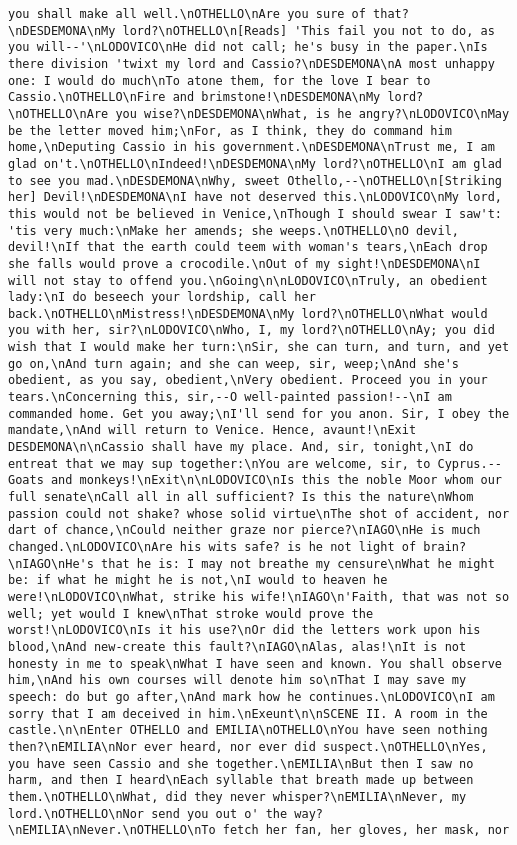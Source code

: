 \begin{verbatim}
you shall make all well.\nOTHELLO\nAre you sure of that?\nDESDEMONA\nMy lord?\nOTHELLO\n[Reads] 'This fail you not to do, as you will--'\nLODOVICO\nHe did not call; he's busy in the paper.\nIs there division 'twixt my lord and Cassio?\nDESDEMONA\nA most unhappy one: I would do much\nTo atone them, for the love I bear to Cassio.\nOTHELLO\nFire and brimstone!\nDESDEMONA\nMy lord?\nOTHELLO\nAre you wise?\nDESDEMONA\nWhat, is he angry?\nLODOVICO\nMay be the letter moved him;\nFor, as I think, they do command him home,\nDeputing Cassio in his government.\nDESDEMONA\nTrust me, I am glad on't.\nOTHELLO\nIndeed!\nDESDEMONA\nMy lord?\nOTHELLO\nI am glad to see you mad.\nDESDEMONA\nWhy, sweet Othello,--\nOTHELLO\n[Striking her] Devil!\nDESDEMONA\nI have not deserved this.\nLODOVICO\nMy lord, this would not be believed in Venice,\nThough I should swear I saw't: 'tis very much:\nMake her amends; she weeps.\nOTHELLO\nO devil, devil!\nIf that the earth could teem with woman's tears,\nEach drop she falls would prove a crocodile.\nOut of my sight!\nDESDEMONA\nI will not stay to offend you.\nGoing\n\nLODOVICO\nTruly, an obedient lady:\nI do beseech your lordship, call her back.\nOTHELLO\nMistress!\nDESDEMONA\nMy lord?\nOTHELLO\nWhat would you with her, sir?\nLODOVICO\nWho, I, my lord?\nOTHELLO\nAy; you did wish that I would make her turn:\nSir, she can turn, and turn, and yet go on,\nAnd turn again; and she can weep, sir, weep;\nAnd she's obedient, as you say, obedient,\nVery obedient. Proceed you in your tears.\nConcerning this, sir,--O well-painted passion!--\nI am commanded home. Get you away;\nI'll send for you anon. Sir, I obey the mandate,\nAnd will return to Venice. Hence, avaunt!\nExit DESDEMONA\n\nCassio shall have my place. And, sir, tonight,\nI do entreat that we may sup together:\nYou are welcome, sir, to Cyprus.--Goats and monkeys!\nExit\n\nLODOVICO\nIs this the noble Moor whom our full senate\nCall all in all sufficient? Is this the nature\nWhom passion could not shake? whose solid virtue\nThe shot of accident, nor dart of chance,\nCould neither graze nor pierce?\nIAGO\nHe is much changed.\nLODOVICO\nAre his wits safe? is he not light of brain?\nIAGO\nHe's that he is: I may not breathe my censure\nWhat he might be: if what he might he is not,\nI would to heaven he were!\nLODOVICO\nWhat, strike his wife!\nIAGO\n'Faith, that was not so well; yet would I knew\nThat stroke would prove the worst!\nLODOVICO\nIs it his use?\nOr did the letters work upon his blood,\nAnd new-create this fault?\nIAGO\nAlas, alas!\nIt is not honesty in me to speak\nWhat I have seen and known. You shall observe him,\nAnd his own courses will denote him so\nThat I may save my speech: do but go after,\nAnd mark how he continues.\nLODOVICO\nI am sorry that I am deceived in him.\nExeunt\n\nSCENE II. A room in the castle.\n\nEnter OTHELLO and EMILIA\nOTHELLO\nYou have seen nothing then?\nEMILIA\nNor ever heard, nor ever did suspect.\nOTHELLO\nYes, you have seen Cassio and she together.\nEMILIA\nBut then I saw no harm, and then I heard\nEach syllable that breath made up between them.\nOTHELLO\nWhat, did they never whisper?\nEMILIA\nNever, my lord.\nOTHELLO\nNor send you out o' the way?\nEMILIA\nNever.\nOTHELLO\nTo fetch her fan, her gloves, her mask, nor 
\end{verbatim}
